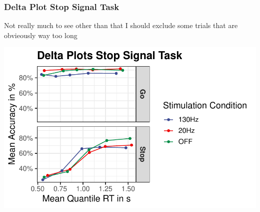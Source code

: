 \documentclass[
  letterpaper,
  DIV=11,
  numbers=noendperiod]{scrartcl}
\begin{document}
\hypertarget{delta-plot-stop-signal-task}{%
\subsubsection{Delta Plot Stop Signal
Task}\label{delta-plot-stop-signal-task}}

Not really much to see other than that I should exclude some trials that
are obvieously way too long

\includegraphics{MF_01_Modelfree_Analysis_files/figure-pdf/unnamed-chunk-15-1.pdf}
\end{document}
